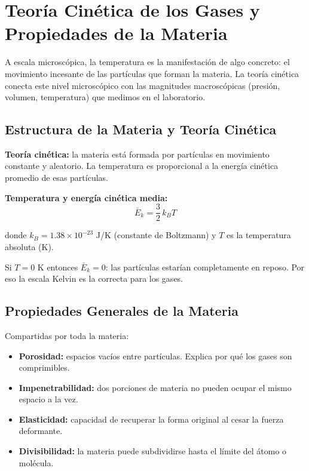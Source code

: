 \section{Teoría Cinética de los Gases y Propiedades de la Materia}

\begin{seccion}
A escala microscópica, la temperatura es la manifestación de algo concreto: el movimiento incesante de las partículas que forman la materia. La teoría cinética conecta este nivel microscópico con las magnitudes macroscópicas (presión, volumen, temperatura) que medimos en el laboratorio.
\end{seccion}

\subsection{Estructura de la Materia y Teoría Cinética}

\begin{seccion}
\begin{definicion}
\textbf{Teoría cinética:} la materia está formada por partículas en movimiento constante y aleatorio. La temperatura es proporcional a la energía cinética promedio de esas partículas.
\end{definicion}

\begin{ecuacion}
\textbf{Temperatura y energía cinética media:}
$$\bar{E}_k = \frac{3}{2}\,k_B T$$

donde $k_B = 1.38 \times 10^{-23}$ J/K (constante de Boltzmann) y $T$ es la temperatura absoluta (K).
\end{ecuacion}

\begin{nota}
Si $T = 0$ K entonces $\bar{E}_k = 0$: las partículas estarían completamente en reposo. Por eso la escala Kelvin es la correcta para los gases.
\end{nota}
\end{seccion}

\subsection{Propiedades Generales de la Materia}

\begin{seccion}
Compartidas por toda la materia:

\begin{itemize}
    \item \textbf{Porosidad:} espacios vacíos entre partículas. Explica por qué los gases son comprimibles.
    \item \textbf{Impenetrabilidad:} dos porciones de materia no pueden ocupar el mismo espacio a la vez.
    \item \textbf{Elasticidad:} capacidad de recuperar la forma original al cesar la fuerza deformante.
    \item \textbf{Divisibilidad:} la materia puede subdividirse hasta el límite del átomo o molécula.
\end{itemize}
\end{seccion}

